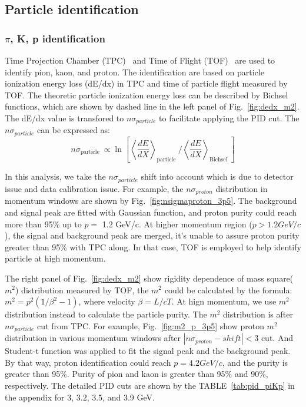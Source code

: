 \subsection{Particle identification}

\subsubsection{$\pi$, K, p identification}

Time Projection Chamber (TPC)~\cite{ANDERSON2003659} and Time of Flight (TOF)~\cite{LLOPE2012S110} are used to identify pion, kaon, and proton. 
The identification are based on particle ionization energy loss (dE/dx) in TPC and time of particle flight measured by TOF.
The theoretic particle ionization energy loss can be described by Bichsel functions, which are shown by dashed line in the left panel of Fig.~\ref{fig:dedx_m2}.
The dE/dx value is transfored to $n\sigma_{particle}$ to facilitate applying the PID cut. The $n\sigma_{particle}$ can be expressed as:
\begin{equation}
n \sigma_{\text {particle }} \propto \ln \left[\left\langle\frac{d E}{d X}\right\rangle_{\text {particle }} /\left\langle\frac{d E}{d X}\right\rangle_{\text {Bichsel }}\right]
\label{eq:nsigma}
\end{equation}

In this analysis, we take the $n\sigma_{particle}$ shift into account which is due to detector issue and data calibration issue.
For example, the $n\sigma_{proton}$ distribution in momentum windows are shown by Fig.~\ref{fig:nsigmaproton_3p5}.
The background and signal peak are fitted with Gaussian function, and proton purity could reach more than 95\% up to $ p =$ 1.2 GeV/c.
At higher momentum region ($p > 1.2 GeV/c$), the signal and background peak are merged, it's unable to assure proton purity greater than 95\% with TPC along.
In that case, TOF is employed to help identify particle at high momentum.

The right panel of Fig.~\ref{fig:dedx_m2} show rigidity dependence of mass square($m^2$) distribution measured by TOF, the $m^2$ could be calculated by the formula: 
$m^2 = p^2(1/\beta^2 - 1)$, where velocity $\beta = L/cT$. At hign momentum, we use $m^2$ distribution instead to calculate the particle purity. 
The $m^2$ distribution is after $n\sigma_{particle}$ cut from TPC. For example, Fig.~\ref{fig:m2_p_3p5} show proton $m^2$ distribution in various momentum windows
after $|n\sigma_{proton} -shift| < 3$ cut. And Student-t function was applied to fit the signal peak and the background peak.
By that way, proton identification could reach $p = 4.2 GeV/c$, and the purity is greater than 95\%. Purity of pion and kaon is greater than 95\% and 90\%, respectively.  
The detailed PID cuts are shown by the TABLE~\ref{tab:pid_piKp} in the appendix for 3, 3.2, 3.5, and 3.9 GeV.

